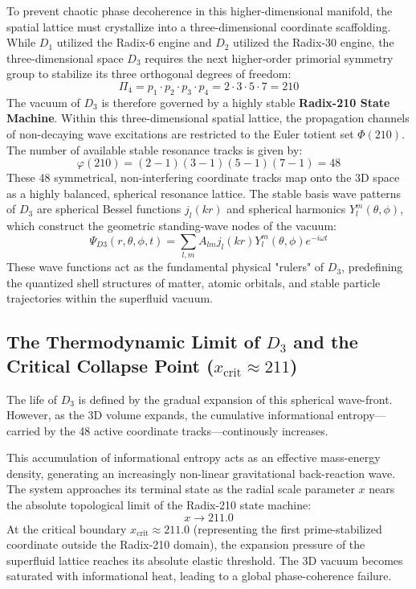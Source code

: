 \documentclass[11pt,a4paper]{article}
\theoremstyle{plain}
\theoremstyle{definition}
\theoremstyle{remark}
\begin{document}
To prevent chaotic phase decoherence in this higher-dimensional manifold, the spatial lattice must crystallize into a three-dimensional coordinate scaffolding. While $D_1$ utilized the Radix-6 engine and $D_2$ utilized the Radix-30 engine, the three-dimensional space $D_3$ requires the next higher-order primorial symmetry group to stabilize its three orthogonal degrees of freedom:
\begin{equation}
\Pi_4 = p_1 \cdot p_2 \cdot p_3 \cdot p_4 = 2 \cdot 3 \cdot 5 \cdot 7 = 210
\end{equation}
The vacuum of $D_3$ is therefore governed by a highly stable \textbf{Radix-210 State Machine}. Within this three-dimensional spatial lattice, the propagation channels of non-decaying wave excitations are restricted to the Euler totient set $\Phi(210)$. The number of available stable resonance tracks is given by:
\begin{equation}
\varphi(210) = (2-1)(3-1)(5-1)(7-1) = 48
\end{equation}
These 48 symmetrical, non-interfering coordinate tracks map onto the 3D space as a highly balanced, spherical resonance lattice. The stable basis wave patterns of $D_3$ are spherical Bessel functions $j_l(kr)$ and spherical harmonics $Y_l^m(\theta, \phi)$, which construct the geometric standing-wave nodes of the vacuum:
\begin{equation}
\Psi_{D3}(r, \theta, \phi, t) = \sum_{l, m} A_{lm} j_l(k r) Y_l^m(\theta, \phi) e^{-i\omega t}
\end{equation}
These wave functions act as the fundamental physical "rulers" of $D_3$, predefining the quantized shell structures of matter, atomic orbitals, and stable particle trajectories within the superfluid vacuum.

\subsection{The Thermodynamic Limit of $D_3$ and the Critical Collapse Point ($x_{\text{crit}} \approx 211$)}
The life of $D_3$ is defined by the gradual expansion of this spherical wave-front. However, as the 3D volume expands, the cumulative informational entropy—carried by the 48 active coordinate tracks—continously increases. 

This accumulation of informational entropy acts as an effective mass-energy density, generating an increasingly non-linear gravitational back-reaction wave. The system approaches its terminal state as the radial scale parameter $x$ nears the absolute topological limit of the Radix-210 state machine:
\begin{equation}
x \to 211.0
\end{equation}
At the critical boundary $x_{\text{crit}} \approx 211.0$ (representing the first prime-stabilized coordinate outside the Radix-210 domain), the expansion pressure of the superfluid lattice reaches its absolute elastic threshold. The 3D vacuum becomes saturated with informational heat, leading to a global phase-coherence failure. 
\end{document}
